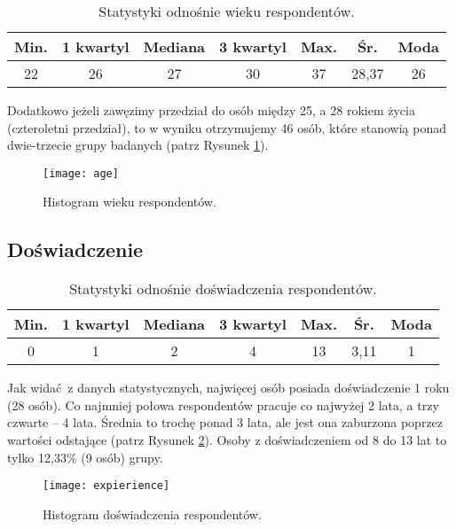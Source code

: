 \begin{table}[h!]
\begin{center}
\begin{tabular}{c c c c c c c}
Min. & 1 kwartyl & Mediana & 3 kwartyl & Max. & Śr. & Moda \\ \hline
22 & 26 & 27 & 30 & 37 & 28,37 & 26 \\
\end{tabular}
\end{center}
\caption{Statystyki odnośnie wieku respondentów.}
\label{tab:age-stats}
\end{table}

Dodatkowo jeżeli zawęzimy przedział do osób między 25, a 28 rokiem życia (czteroletni przedział), to w wyniku otrzymujemy 46 osób, które stanowią ponad dwie-trzecie grupy badanych (patrz Rysunek \ref{fig:age}).

\begin{figure}[h]
\begin{center}
\texttt{[image: age]}
\end{center}
\caption{Histogram wieku respondentów.}
\label{fig:age}
\end{figure}

\subsection{Doświadczenie}

\begin{table}[h!]
\begin{center}
\begin{tabular}{c c c c c c c}
Min. & 1 kwartyl & Mediana & 3 kwartyl & Max. & Śr. & Moda \\ \hline
0 & 1 & 2 & 4 & 13 & 3,11 & 1 \\
\end{tabular}
\end{center}
\caption{Statystyki odnośnie doświadczenia respondentów.}
\label{tab:expierience-stats}
\end{table}

Jak widać z danych statystycznych, najwięcej osób posiada doświadczenie 1 roku (28 osób). Co najmniej połowa respondentów pracuje co najwyżej 2 lata, a trzy czwarte -- 4 lata. Średnia to trochę ponad 3 lata, ale jest ona zaburzona poprzez wartości odstające (patrz Rysunek \ref{fig:expierience}). Osoby z doświadczeniem od 8 do 13 lat to tylko 12,33\% (9 osób) grupy.

\begin{figure}[h]
\begin{center}
\texttt{[image: expierience]}
\end{center}
\caption{Histogram doświadczenia respondentów.}
\label{fig:expierience}
\end{figure}

